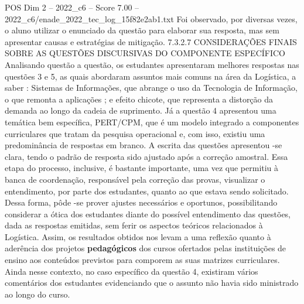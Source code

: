 \begin{textsample}{POS Dim 2 – 2022\_c6 – Score 7.00 – 2022\_c6/enade\_2022\_tec\_log\_15f82e2ab1.txt}
Foi observado, por diversas vezes, o aluno utilizar o enunciado da questão para elaborar sua resposta, mas sem apresentar causas e estratégias de mitigação. 7.3.2.7 CONSIDERAÇÕES FINAIS SOBRE AS QUESTÕES DISCURSIVAS DO COMPONENTE ESPECÍFICO Analisando questão a questão, os estudantes apresentaram melhores respostas nas questões 3 e 5, as quais abordaram assuntos mais comuns na área da Logística, a saber : Sistemas de Informações, que abrange o uso da Tecnologia de Informação, o que remonta a aplicações ; e efeito chicote, que representa a distorção da demanda ao longo da cadeia de suprimento.
Já a questão 4 apresentou uma temática bem específica, PERT/CPM, que é um modelo integrado a componentes curriculares que tratam da pesquisa operacional e, com isso, existiu uma predominância de respostas em branco.
A escrita das questões apresentou -se clara, tendo o padrão de resposta sido ajustado após a correção amostral.
Essa etapa do processo, inclusive, é bastante importante, uma vez que permitiu à banca de coordenação, responsável pela correção das provas, visualizar o entendimento, por parte dos estudantes, quanto ao que estava sendo solicitado.
Dessa forma, pôde -se prover ajustes necessários e oportunos, possibilitando considerar a ótica dos estudantes diante do possível entendimento das questões, dada as respostas emitidas, sem ferir os aspectos teóricos relacionados à Logística.
Assim, os resultados obtidos nos levam a uma reflexão quanto à aderência dos projetos \textbf{pedagógicos} dos cursos ofertados pelas instituições de ensino aos conteúdos previstos para comporem as suas matrizes curriculares.
Ainda nesse contexto, no caso específico da questão 4, existiram vários comentários dos estudantes evidenciando que o assunto não havia sido ministrado ao longo do curso.

\end{textsample}

